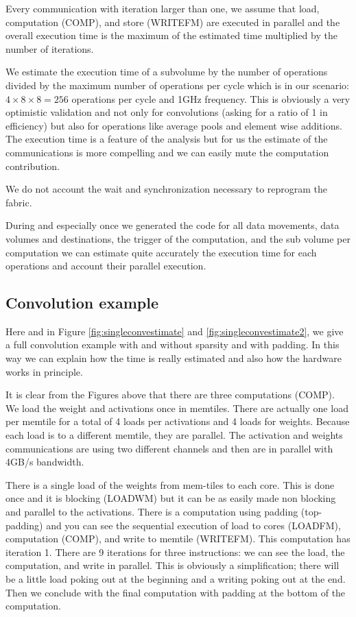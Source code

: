 \documentclass[conference]{IEEEtran}
\begin{document}
Every communication with iteration larger than one, we assume that
load, computation (COMP), and store (WRITEFM) are executed in parallel
and the overall execution time is the maximum of the estimated time
multiplied by the number of iterations.

We estimate the execution time of a subvolume by the number of
operations divided by the maximum number of operations per cycle which
is in our scenario: $4\times 8 \times 8 = 256 $ operations per cycle
and 1GHz frequency. This is obviously a very optimistic validation and
not only for convolutions (asking for a ratio of 1 in efficiency) but
also for operations like average pools and element wise additions. The
execution time is a feature of the analysis but for us the estimate of
the communications is more compelling and we can easily mute the
computation contribution.

We do not account the wait and synchronization necessary to reprogram
the fabric.

During and especially once we generated the code for all data
movements, data volumes and destinations, the trigger of the
computation, and the sub volume per computation we can estimate quite
accurately the execution time for each operations and account their
parallel execution.

\subsection{Convolution example}
Here and in Figure \ref{fig:singleconvestimate} and
\ref{fig:singleconvestimate2}, we give a full convolution example with
and without sparsity and with padding. In this way we can explain how
the time is really estimated and also how the hardware works in
principle.

It is clear from the Figures above that there are three computations
(COMP). We load the weight and activations once in memtiles. There are
actually one load per memtile for a total of 4 loads per activations
and 4 loads for weights. Because each load is to a different
memtile, they are parallel.  The activation and weights communications
are using two different channels and then are in parallel with 4GB/s
bandwidth.

There is a single load of the weights from mem-tiles to each
core. This is done once and it is blocking (LOADWM) but it can be as
easily made non blocking and parallel to the activations. There is a
computation using padding (top-padding) and you can see the sequential
execution of load to cores (LOADFM), computation (COMP), and write to
memtile (WRITEFM). This computation has iteration 1. There are 9
iterations for three instructions: we can see the load, the
computation, and write in parallel. This is obviously a simplification;
there will be a little load poking out at the beginning and a writing
poking out at the end.  Then we conclude with the final computation
with padding at the bottom of the computation.
\end{document}
